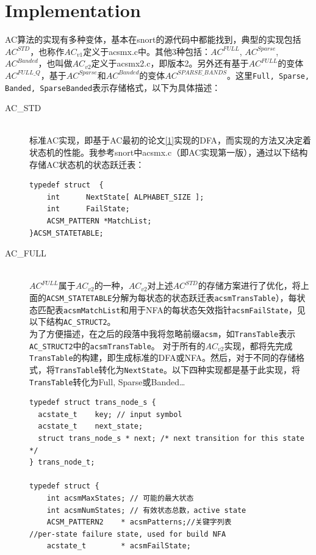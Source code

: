 \documentclass{article}
\begin{document}
\section{Implementation}
\label{impl}
AC算法的实现有多种变体，基本在snort的源代码中都能找到，典型的实现包括$AC^{STD}$，也称作$AC_{v1}$定义于acsmx.c中。其他3种包括：$AC^{FULL}$, $AC^{Sparse}$, $AC^{Banded}$，也叫做$AC_{v2}$定义于acsmx2.c，即版本2。另外还有基于$AC^{FULL}$的变体$AC^{FULL\_Q}$，基于$AC^{Sparse}$和$AC^{Banded}$的变体$AC^{SPARSE\_BANDS}$。这里\texttt{Full, Sparse, Banded, SparseBanded}表示存储格式，以下为具体描述：
\begin{description}
\item[AC\_STD] \hfill \\
标准AC实现，即基于AC最初的论文\ref{1}实现的DFA，而实现的方法又决定着状态机的性能。我参考snort中acsmx.c（即AC实现第一版），通过以下结构存储AC状态机的状态跃迁表：
\begin{lstlisting}
typedef struct  {
    int      NextState[ ALPHABET_SIZE ];
    int      FailState;
    ACSM_PATTERN *MatchList;
}ACSM_STATETABLE;
\end{lstlisting}
\item[AC\_FULL] \hfill \\
$AC^{FULL}$属于$AC_{v2}$的一种，$AC_{v2}$对上述$AC^{STD}$的存储方案进行了优化，将上面的\lstinline|ACSM_STATETABLE|分解为每状态的状态跃迁表\lstinline|acsmTransTable|），每状态匹配表\lstinline|acsmMatchList|和用于NFA的每状态矢效指针\lstinline|acsmFailState|，见以下结构\lstinline|AC_STRUCT2|。\\为了方便描述，在之后的段落中我将忽略前缀\lstinline|acsm|，如\lstinline|TransTable|表示\lstinline|AC_STRUCT2|中的\lstinline|acsmTransTable|。
对于所有的$AC_{v2}$实现，都将先完成\lstinline|TransTable|的构建，即生成标准的DFA或NFA。然后，对于不同的存储格式，将\lstinline|TransTable|转化为\lstinline|NextState|。以下四种实现都是基于此实现，将\lstinline|TransTable|转化为Full, Sparse或Banded…
\begin{lstlisting}
typedef struct trans_node_s {
  acstate_t    key; // input symbol
  acstate_t    next_state;
  struct trans_node_s * next; /* next transition for this state */
} trans_node_t;

typedef struct {
    int acsmMaxStates; // 可能的最大状态
    int acsmNumStates; // 有效状态总数，active state
    ACSM_PATTERN2    * acsmPatterns;//关键字列表
//per-state failure state, used for build NFA
    acstate_t        * acsmFailState;


\end{lstlisting}
\end{description}
\end{document}
